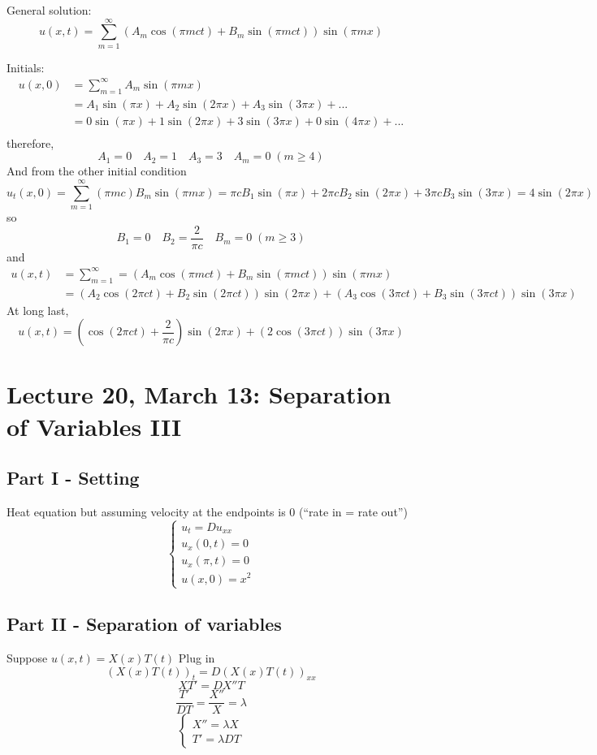 \documentclass[12pt]{article}
\begin{document}
General solution:
\[u(x, t) = \sum_{m=1}^\infty (A_m\cos(\pi m ct) + B_m\sin(\pi mct)) \sin(\pi m x)\]

Initials:
\begin{align*}
    u(x, 0) &= \sum_{m=1}^\infty A_m \sin(\pi m x)\\
    &= A_1\sin(\pi x) + A_2\sin(2\pi x) + A_3\sin(3\pi x) + ...\\
    &= 0\sin(\pi x) + 1\sin(2\pi x) + 3\sin(3\pi x) + 0\sin(4\pi x)+ ...\\
\end{align*}
therefore, 
\[A_1 = 0 \quad A_2 = 1 \quad A_3 = 3 \quad A_m = 0 \; (m \geq 4)\]
And from the other initial condition
\[u_t(x, 0) = \sum_{m=1}^\infty (\pi mc)B_m\sin(\pi mx) = \pi cB_1 \sin(\pi x) + 2\pi cB_2\sin(2\pi x) + 3\pi cB_3\sin(3\pi x) = 4\sin(2\pi x)\]
so 
\[B_1 = 0 \quad B_2 = \frac{2}{\pi c} \quad B_m = 0 \; (m \geq 3)\]
and 
\begin{align*}
    u(x, t) &= \sum_{m=1}^\infty =(A_m\cos(\pi m ct) + B_m\sin(\pi mct)) \sin(\pi m x) \\
    &= (A_2\cos(2\pi ct) + B_2\sin(2\pi ct)) \sin(2\pi x) + (A_3\cos(3\pi ct) + B_3\sin(3\pi ct)) \sin(3\pi x)
\end{align*}
At long last,
\[\boxed{u(x, t) = \left(\cos(2\pi ct) + \frac{2}{\pi c}\right)\sin(2\pi x) + (2\cos(3\pi ct))\sin(3\pi x)}\]

\section*{Lecture 20, March 13: Separation of Variables III}
\subsection*{Part I - Setting}
Heat equation but assuming velocity at the endpoints is 0 (``rate in = rate out'')
\[\begin{cases}
    u_t = Du_{xx}\\
    u_x(0, t) = 0\\
    u_x(\pi, t) = 0\\
    u(x, 0) = x^2
\end{cases}\]

\subsection*{Part II - Separation of variables}
Suppose $u(x, t) = X(x)T(t)$
Plug in 
\[(X(x)T(t))_t = D(X(x)T(t))_{xx} \]
\[XT' = DX''T\]
\[\frac{T'}{DT} = \frac{X''}{X} = \lambda\]
\[\begin{cases}
    X'' = \lambda X\\
    T' = \lambda DT
\end{cases}\]
\end{document}
